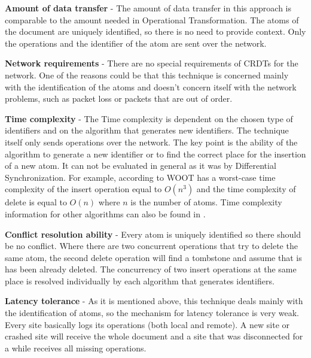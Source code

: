 \documentclass[12pt,oneside]{fithesis2}
\begin{document}
\vspace{3mm} 

\textbf{Amount of data transfer} - The amount of data transfer in this approach is comparable to the amount needed in Operational Transformation. The atoms of the document are uniquely identified, so there is no need to provide context. Only the operations and the identifier of the atom are sent over the network.

\vspace{3mm} 

\textbf{Network requirements} - There are no special requirements of CRDTs for the network. One of the reasons could be that this technique is concerned mainly with the identification of the atoms and doesn't concern itself with the network problems, such as packet loss or packets that are out of order.

\vspace{3mm} 

\textbf{Time complexity} - The Time complexity is dependent on the chosen type of identifiers and on the algorithm that generates new identifiers. The technique itself only sends operations over the network. The key point is the ability of the algorithm to generate a new identifier or to find the correct place for the insertion of a new atom. It can not be evaluated in general as it was by Differential Synchronization. For example, according to \cite{CRDT-real} WOOT has a worst-case time complexity of the insert operation equal to \(O(n^3)\) and the time complexity of delete is equal to \(O(n)\) where \(n\) is the number of atoms. Time complexity information for other algorithms can also be found in \cite{CRDT-real}.

\vspace{3mm} 

\textbf{Conflict resolution ability} - Every atom is uniquely identified so there should be no conflict. Where there are two concurrent operations that try to delete the same atom, the second delete operation will find a tombstone and assume that is has been already deleted. The concurrency of two insert operations at the same place is resolved individually by each algorithm that generates identifiers.

\vspace{3mm} 
\newpage
\textbf{Latency tolerance} - As it is mentioned above, this technique deals mainly with the identification of atoms, so the mechanism for latency tolerance is very weak. Every site basically logs its operations (both local and remote). A new site or crashed site will receive the whole document and a site that was disconnected for a while receives all missing operations.\cite{Shapiro-design}
\end{document}
